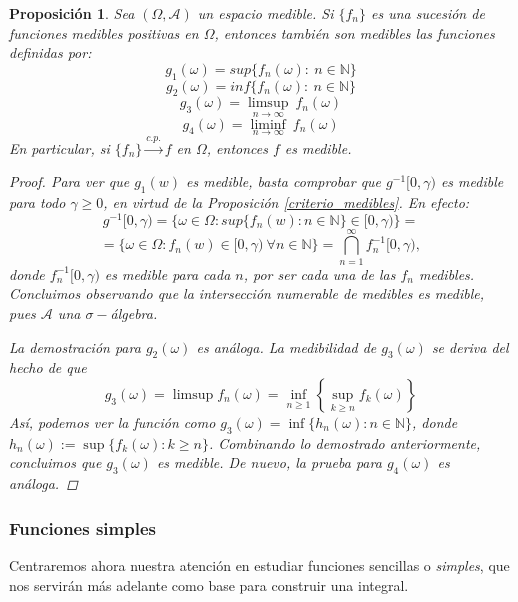 \documentclass[11pt, a4paper]{article}
\newcommand{\fn}{\{f_n\}}
\theoremstyle{theorem-style}
\newtheorem{nprop}{Proposición}[section]
\theoremstyle{definition-style}
\theoremstyle{remark-style}
\theoremstyle{example-style}
\begin{document}
\begin{nprop} \label {p1}
  Sea $(\Omega,\mathcal{A})$ un espacio medible. Si $\{f_n\}$ es una sucesión de funciones medibles positivas en $\Omega$, entonces también son medibles las funciones definidas por:
  \[
    g_1(\omega) =  sup\{f_n(\omega) : \ n \in \mathbb{N} \}
  \]
  \[
    g_2(\omega) =  inf\{f_n(\omega) : \ n \in \mathbb{N} \}
  \]
  \[
    g_3(\omega) = \limsup_{n\to \infty} \ f_n(\omega)
  \]
  \[
    g_4(\omega) = \liminf_{n\to \infty}  \ f_n(\omega)
  \]
  En particular, si $\fn \xrightarrow{c.p.} f$ en $\Omega$, entonces $f$ es medible.
  
  \begin{proof}
	Para ver que $g_1(w)$ es medible, basta comprobar que $g^{-1}[0,\gamma)$ es medible para todo $\gamma \ge 0$, en virtud de la \textit{Proposición \ref{criterio_medibles}}. En efecto: $$g^{-1}[0,\gamma) = \{\omega \in \Omega : sup\{f_n(w) : n \in \mathbb{N}\} \in [0,\gamma)\} =$$  $$ = \{ \omega \in \Omega : f_n(w) \in [0,\gamma) \ \forall n \in \mathbb{N}\} = \bigcap_{n=1}^{\infty} f_n^{-1}[0,\gamma), $$ donde $f_n^{-1}[0,\gamma)$ es medible para cada $n$, por ser cada una de las $f_n$ medibles. Concluimos observando que la intersección numerable de medibles es medible, pues $\mathcal A$ una $\sigma-$álgebra.
	
	La demostración para $g_2(\omega)$ es análoga. La medibilidad de $g_3(\omega)$ se deriva del hecho de que $$g_3(\omega) = \limsup f_n(\omega) = \inf_{n \ge 1} \left\{\sup_{k\ge n} f_k(\omega) \right\}$$ Así, podemos ver la función como $g_3(\omega) = \inf \{h_n(\omega) : n \in \mathbb{N}\}$, donde $h_n(\omega) := \sup \{f_k(\omega) : k \ge n\}$. Combinando lo demostrado anteriormente, concluimos que $g_3(\omega)$ es medible. De nuevo, la prueba para $g_4(\omega)$ es análoga.
\end{proof}
\end{nprop}



\subsubsection*{Funciones simples}

Centraremos ahora nuestra atención en estudiar funciones sencillas o \textit{simples}, que nos servirán más adelante como base para construir una integral.
\end{document}
